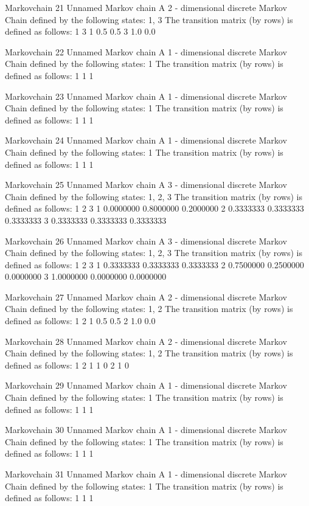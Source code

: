 \documentclass[
  nojss]{jss}
\begin{document}
\begin{CodeChunk}
\begin{CodeOutput}
Markovchain  21 
Unnamed Markov chain 
 A  2 - dimensional discrete Markov Chain defined by the following states: 
 1, 3 
 The transition matrix  (by rows)  is defined as follows: 
    1   3
1 0.5 0.5
3 1.0 0.0

Markovchain  22 
Unnamed Markov chain 
 A  1 - dimensional discrete Markov Chain defined by the following states: 
 1 
 The transition matrix  (by rows)  is defined as follows: 
  1
1 1

Markovchain  23 
Unnamed Markov chain 
 A  1 - dimensional discrete Markov Chain defined by the following states: 
 1 
 The transition matrix  (by rows)  is defined as follows: 
  1
1 1

Markovchain  24 
Unnamed Markov chain 
 A  1 - dimensional discrete Markov Chain defined by the following states: 
 1 
 The transition matrix  (by rows)  is defined as follows: 
  1
1 1

Markovchain  25 
Unnamed Markov chain 
 A  3 - dimensional discrete Markov Chain defined by the following states: 
 1, 2, 3 
 The transition matrix  (by rows)  is defined as follows: 
          1         2         3
1 0.0000000 0.8000000 0.2000000
2 0.3333333 0.3333333 0.3333333
3 0.3333333 0.3333333 0.3333333

Markovchain  26 
Unnamed Markov chain 
 A  3 - dimensional discrete Markov Chain defined by the following states: 
 1, 2, 3 
 The transition matrix  (by rows)  is defined as follows: 
          1         2         3
1 0.3333333 0.3333333 0.3333333
2 0.7500000 0.2500000 0.0000000
3 1.0000000 0.0000000 0.0000000

Markovchain  27 
Unnamed Markov chain 
 A  2 - dimensional discrete Markov Chain defined by the following states: 
 1, 2 
 The transition matrix  (by rows)  is defined as follows: 
    1   2
1 0.5 0.5
2 1.0 0.0

Markovchain  28 
Unnamed Markov chain 
 A  2 - dimensional discrete Markov Chain defined by the following states: 
 1, 2 
 The transition matrix  (by rows)  is defined as follows: 
  1 2
1 1 0
2 1 0

Markovchain  29 
Unnamed Markov chain 
 A  1 - dimensional discrete Markov Chain defined by the following states: 
 1 
 The transition matrix  (by rows)  is defined as follows: 
  1
1 1

Markovchain  30 
Unnamed Markov chain 
 A  1 - dimensional discrete Markov Chain defined by the following states: 
 1 
 The transition matrix  (by rows)  is defined as follows: 
  1
1 1

Markovchain  31 
Unnamed Markov chain 
 A  1 - dimensional discrete Markov Chain defined by the following states: 
 1 
 The transition matrix  (by rows)  is defined as follows: 
  1
1 1


\end{CodeOutput}
\end{CodeChunk}
\end{document}
